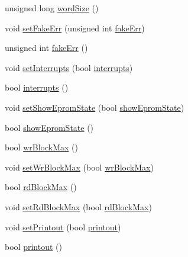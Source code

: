 \begin{DoxyCompactItemize}
\item 
unsigned long \hyperlink{classUsbFTInterface_add098ede127a2089e3ac8ea615ed6d46}{word\+Size} ()
\item 
void \hyperlink{classUsbFTInterface_aec057577db0b913beedf1e9896498e10}{set\+Fake\+Err} (unsigned int \hyperlink{classUsbFTInterface_abb29c7f73506259ef57d1e25204f8f7c}{fake\+Err})
\item 
unsigned int \hyperlink{classUsbFTInterface_abb29c7f73506259ef57d1e25204f8f7c}{fake\+Err} ()
\item 
void \hyperlink{classUsbFTInterface_a6fb31500f8a6adbd3d6f84f7932844da}{set\+Interrupts} (bool \hyperlink{classUsbFTInterface_a1831ba02d9707ded902af4cb1df8863f}{interrupts})
\item 
bool \hyperlink{classUsbFTInterface_a1831ba02d9707ded902af4cb1df8863f}{interrupts} ()
\item 
void \hyperlink{classUsbFTInterface_aff0c9289dfd34e05e472f2f115f78a01}{set\+Show\+Eprom\+State} (bool \hyperlink{classUsbFTInterface_a6e9b97244aaac289792fbef24daad33e}{show\+Eprom\+State})
\item 
bool \hyperlink{classUsbFTInterface_a6e9b97244aaac289792fbef24daad33e}{show\+Eprom\+State} ()
\item 
bool \hyperlink{classUsbFTInterface_ad73d2d990fdda96ee53566daaeb73abc}{wr\+Block\+Max} ()
\item 
void \hyperlink{classUsbFTInterface_ab2e58c22979ffa60adf609eca2af78d3}{set\+Wr\+Block\+Max} (bool \hyperlink{classUsbFTInterface_ad73d2d990fdda96ee53566daaeb73abc}{wr\+Block\+Max})
\item 
bool \hyperlink{classUsbFTInterface_a9f213ab1804e61af476bbdd3ade2d053}{rd\+Block\+Max} ()
\item 
void \hyperlink{classUsbFTInterface_a63615ac245f36dc6a298228d8dcd31c4}{set\+Rd\+Block\+Max} (bool \hyperlink{classUsbFTInterface_a9f213ab1804e61af476bbdd3ade2d053}{rd\+Block\+Max})
\item 
void \hyperlink{classUsbFTInterface_a6f31debb1d94a65deb3acb72e3608f27}{set\+Printout} (bool \hyperlink{classUsbFTInterface_ad312ac511dfb57c513f2998de396ba9b}{printout})
\item 
bool \hyperlink{classUsbFTInterface_ad312ac511dfb57c513f2998de396ba9b}{printout} ()
\end{DoxyCompactItemize}
